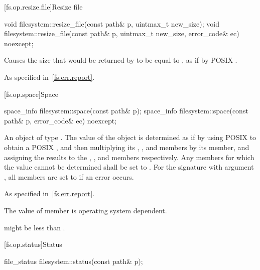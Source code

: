 [fs.op.resize.file]{Resize file}

%
\begin{itemdecl}
void filesystem::resize_file(const path& p, uintmax_t new_size);
void filesystem::resize_file(const path& p, uintmax_t new_size, error_code& ec) noexcept;
\end{itemdecl}

\begin{itemdescr}
\pnum
\effects
Causes the size that would be returned by  to be
equal to , as if by POSIX .

\pnum
\throws
As specified in~\ref{fs.err.report}.
\end{itemdescr}


[fs.op.space]{Space}

%
\begin{itemdecl}
space_info filesystem::space(const path& p);
space_info filesystem::space(const path& p, error_code& ec) noexcept;
\end{itemdecl}

\begin{itemdescr}
\pnum
\returns
An object of type . The value of the 
  object is determined as if by using POSIX 
  to obtain a POSIX ,
  and then multiplying its , ,
  and  members by its  member,
  and assigning the results to the , ,
  and  members respectively. Any members for which the
  value cannot be determined shall be set to .
  For the signature with argument , all members are set to
   if an error occurs.

\pnum
\throws
As specified in~\ref{fs.err.report}.

\pnum
\remarks
The value of member 
      is operating system dependent.
\begin{note}
 might be
      less than .
\end{note}
\end{itemdescr}


[fs.op.status]{Status}

%
\begin{itemdecl}
file_status filesystem::status(const path& p);
\end{itemdecl}

